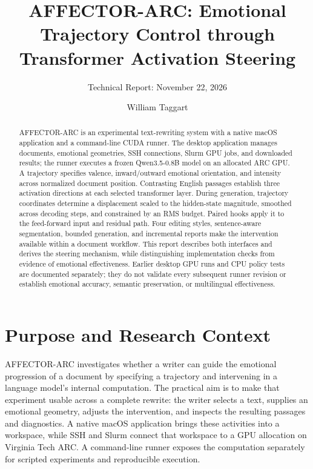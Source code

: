\documentclass[manuscript,screen,nonacm]{acmart}
\begin{document}
\title{AFFECTOR-ARC: Emotional Trajectory Control through Transformer
Activation Steering}
\author{William Taggart}
\subtitle{Technical Report: November 22, 2026}
\begin{abstract}
AFFECTOR-ARC is an experimental text-rewriting system with a native macOS application and a command-line CUDA runner. The desktop application manages documents, emotional geometries, SSH connections, Slurm GPU jobs, and downloaded results; the runner executes a frozen Qwen3.5-0.8B model on an allocated ARC GPU. A trajectory specifies valence, inward/outward emotional orientation, and intensity across normalized document position. Contrasting English passages establish three activation directions at each selected transformer layer. During generation, trajectory coordinates determine a displacement scaled to the hidden-state magnitude, smoothed across decoding steps, and constrained by an RMS budget. Paired hooks apply it to the feed-forward input and residual path. Four editing styles, sentence-aware segmentation, bounded generation, and incremental reports make the intervention available within a document workflow. This report describes both interfaces and derives the steering mechanism, while distinguishing implementation checks from evidence of emotional effectiveness. Earlier desktop GPU runs and CPU policy tests are documented separately; they do not validate every subsequent runner revision or establish emotional accuracy, semantic preservation, or multilingual effectiveness.
\end{abstract}
\maketitle
\section{Purpose and Research Context}\label{literature-review-activation-steering-and-emotion}\label{problem-and-operating-principle}

AFFECTOR-ARC investigates whether a writer can guide the emotional progression of a document by specifying a trajectory and intervening in a language model's internal computation. The practical aim is to make that experiment usable across a complete rewrite: the writer selects a text, supplies an emotional geometry, adjusts the intervention, and inspects the resulting passages and diagnostics. A native macOS application brings these activities into a workspace, while SSH and Slurm connect that workspace to a GPU allocation on Virginia Tech ARC. A command-line runner exposes the computation separately for scripted experiments and reproducible execution.
\end{document}
